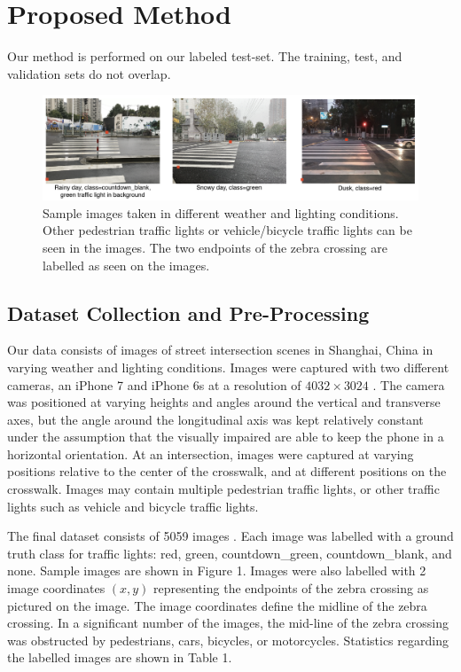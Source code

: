 \documentclass[runningheads]{llncs}
\begin{document}
\section{Proposed Method}
Our method is performed on our labeled test-set. The training, test, and validation sets do not overlap.
\begin{figure}
\includegraphics[width=\textwidth]{figure1.png}
\caption{Sample images taken in different weather and lighting conditions. Other pedestrian traffic lights or vehicle/bicycle traffic lights can be seen in the images. The two endpoints of the zebra crossing are labelled as seen on the images.} \label{figure1}
\end{figure}
\subsection{Dataset Collection and Pre-Processing}
Our data consists of images of street intersection scenes in Shanghai, China in varying weather and lighting conditions. Images were captured with two different cameras, an iPhone 7 and iPhone 6s at a resolution of $4032 \times 3024$ \cite{2}. The camera was positioned at varying heights and angles around the vertical and transverse axes, but the angle around the longitudinal axis was kept relatively constant under the assumption that the visually impaired are able to keep the phone in a horizontal orientation. At an intersection, images were captured at varying positions relative to the center of the crosswalk, and at different positions on the crosswalk. Images may contain multiple pedestrian traffic lights, or other traffic lights such as vehicle and bicycle traffic lights. 

The final dataset consists of 5059 images \cite{2}. Each image was labelled with a ground truth class for traffic lights: red, green, countdown\_green, countdown\_blank, and none. Sample images are shown in Figure 1. Images were also labelled with 2 image coordinates $(x,y)$ representing the endpoints of the zebra crossing as pictured on the image. The image coordinates define the midline of the zebra crossing. In a significant number of the images, the mid-line of the zebra crossing was obstructed by pedestrians, cars, bicycles, or motorcycles. Statistics regarding the labelled images are shown in Table 1. 
\end{document}
